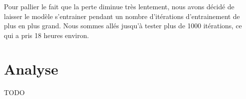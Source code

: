 \documentclass{article}
\begin{document}
Pour pallier le fait que la perte diminue très lentement, nous avons décidé de
laisser le modèle s’entrainer pendant un nombre d’itérations d’entrainement de
plus en plus grand. Nous sommes allés jusqu’à tester plus de 1000 itérations, ce
qui a pris 18 heures environ.

\section{Analyse}
TODO




\end{document}
